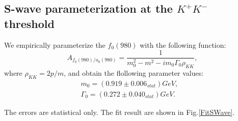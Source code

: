 \subsection{S-wave parameterization at the $K^{+}K^{-}$ threshold}
\label{MIPPWA-RES}
\par{We empirically parameterize the $f_{0}(980)$ with the following function:
    \begin{equation}
        A_{f_{0}(980) / a_{0}(980)} = \frac{1}{m_{0}^{2} - m^{2} -im_{0}\Gamma_{0}\rho_{KK}}, \label{a0980-RBW}
    \end{equation}
    where $\rho_{KK} = 2p/m$, and obtain the flollowing parameter values:
    \begin{equation}
        \begin{array}{lr}
            m_{0} = (0.919 \pm 0.006_{stat}) GeV, &\\
            \Gamma_{0} = (0.272 \pm 0.040_{stat}) GeV. &
        \end{array}\label{S-wave parameters} 
    \end{equation}


    The errors are statistical only. The fit result are shown in Fig.\ref{FitSWave}.
    
}

